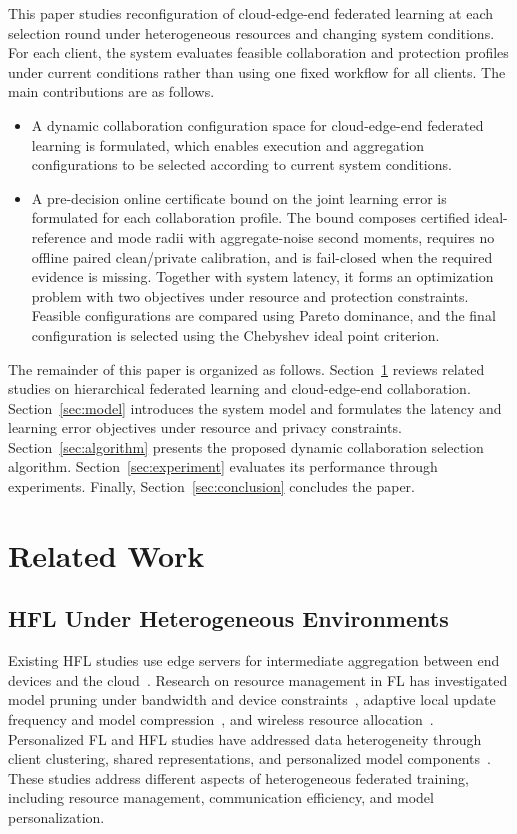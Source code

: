 \documentclass[5p,times]{elsarticle}
\theoremstyle{plain}
\theoremstyle{definition}
\theoremstyle{remark}
\begin{document}
This paper studies reconfiguration of cloud-edge-end federated learning at each
selection round under heterogeneous resources and changing system conditions. For
each client, the system evaluates feasible collaboration and protection profiles
under current conditions rather than using one fixed workflow for all clients.
The main contributions are as follows.
\begin{itemize}
    \item A dynamic collaboration configuration space for cloud-edge-end federated learning is formulated, which enables execution and aggregation configurations to be selected according to current system conditions.

    \item A pre-decision online certificate bound on the joint learning error is formulated for each collaboration profile. The bound composes certified ideal-reference and mode radii with aggregate-noise second moments, requires no offline paired clean/private calibration, and is fail-closed when the required evidence is missing. Together with system latency, it forms an optimization problem with two objectives under resource and protection constraints. Feasible configurations are compared using Pareto dominance, and the final configuration is selected using the Chebyshev ideal point criterion.
\end{itemize}

The remainder of this paper is organized as follows.
Section~\ref{sec:related_work} reviews related studies
on hierarchical federated learning and cloud-edge-end
collaboration.
Section~\ref{sec:model} introduces the system model
and formulates the latency and learning error objectives
under resource and privacy constraints.
Section~\ref{sec:algorithm} presents the proposed
dynamic collaboration selection algorithm.
Section~\ref{sec:experiment} evaluates its performance
through experiments.
Finally, Section~\ref{sec:conclusion} concludes the paper.

\section{Related Work}
\label{sec:related_work}
\subsection{HFL Under Heterogeneous Environments}
Existing HFL studies use edge servers for intermediate aggregation between end devices and the cloud~\cite{hfl}. Research on resource management in FL has investigated model pruning under bandwidth and device constraints~\cite{phfl}, adaptive local update frequency and model compression~\cite{xu2022adaptive,wang2019adaptivefl}, and wireless resource allocation~\cite{dinh2021wirelessfl}. Personalized FL and HFL studies have addressed data heterogeneity through client clustering, shared representations, and personalized model components~\cite{sattler2020clustered,collins2021exploiting,Personalizedhfl}. These studies address different aspects of heterogeneous federated training, including resource management, communication efficiency, and model personalization.
\end{document}
